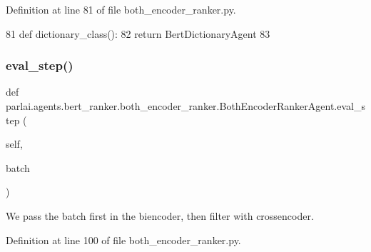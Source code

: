 Definition at line 81 of file both\+\_\+encoder\+\_\+ranker.\+py.


\begin{DoxyCode}
81     \textcolor{keyword}{def }dictionary\_class():
82         \textcolor{keywordflow}{return} BertDictionaryAgent
83 
\end{DoxyCode}
\mbox{\label{classparlai_1_1agents_1_1bert__ranker_1_1both__encoder__ranker_1_1BothEncoderRankerAgent_a6d189366af4a1264770d59e4b114967a}} 
\subsubsection{\texorpdfstring{eval\+\_\+step()}{eval\_step()}}
{\footnotesize\ttfamily def parlai.\+agents.\+bert\+\_\+ranker.\+both\+\_\+encoder\+\_\+ranker.\+Both\+Encoder\+Ranker\+Agent.\+eval\+\_\+step (\begin{DoxyParamCaption}\item[{}]{self,  }\item[{}]{batch }\end{DoxyParamCaption})}

\begin{DoxyVerb}We pass the batch first in the biencoder, then filter with crossencoder.
\end{DoxyVerb}
 

Definition at line 100 of file both\+\_\+encoder\+\_\+ranker.\+py.


